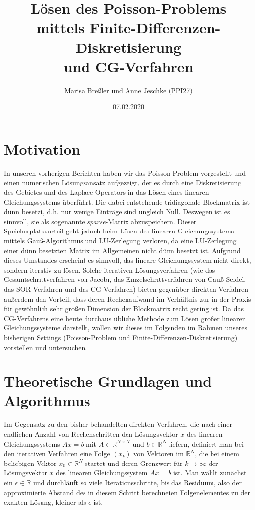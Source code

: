 \documentclass{scrartcl}
\begin{document}
\title{Lösen des Poisson-Problems mittels Finite-Differenzen-Diskretisierung\\
und CG-Verfahren}
\author{Marisa Breßler und Anne Jeschke (PPI27)}
\date{07.02.2020}
\maketitle

\tableofcontents

\pagebreak
\section{Motivation}
In unseren vorherigen Berichten haben wir das Poisson-Problem vorgestellt und einen numerischen Lösungsansatz aufgezeigt, der es durch eine Diskretisierung des Gebietes und des Laplace-Operators in das Lösen eines linearen Gleichungssystems überführt.
Die dabei entstehende tridiagonale Blockmatrix ist dünn besetzt, d.h. nur wenige Einträge sind ungleich Null.
Deswegen ist es sinnvoll, sie als sogenannte \textit{sparse}-Matrix abzuspeichern.
Dieser Speicherplatzvorteil geht jedoch beim Lösen des linearen Gleichungssystems mittels Gauß-Algorithmus und LU-Zerlegung verloren, da eine LU-Zerlegung einer dünn besetzten Matrix im Allgemeinen nicht dünn besetzt ist.
Aufgrund dieses Umstandes erscheint es sinnvoll, das lineare Gleichungssystem nicht direkt, sondern iterativ zu lösen.
Solche iterativen Lösungsverfahren (wie das Gesamtschrittverfahren von Jacobi, das Einzelschrittverfahren von Gauß-Seidel, das SOR-Verfahren und das CG-Verfahren) bieten gegenüber direkten Verfahren außerdem den Vorteil, dass deren Rechenaufwand im Verhältnis zur in der Praxis für gewöhnlich sehr großen Dimension der Blockmatrix recht gering ist.
Da das CG-Verfahrens eine heute durchaus übliche Methode zum Lösen großer linearer Gleichungssysteme darstellt, wollen wir dieses im Folgenden im Rahmen unseres bisherigen Settings (Poisson-Problem und Finite-Differenzen-Diskretisierung) vorstellen und untersuchen.



\pagebreak
\section{Theoretische Grundlagen und Algorithmus}

Im Gegensatz zu den bisher behandelten direkten Verfahren, die nach einer endlichen Anzahl von Rechenschritten den Lösungsvektor $x$ des linearen Gleichungssystems $Ax=b$ mit $A\in\mathbb{R}^{N\times N}$ und $b\in\mathbb{R}^N$ liefern, definiert man bei den iterativen Verfahren eine Folge $(x_k)$ von Vektoren im $\mathbb{R}^N$, die bei einem beliebigen Vektor $x_0\in\mathbb{R}^N$ startet und deren Grenzwert für $k \to \infty$ der Lösungsvektor $x$ des linearen Gleichungssystem $Ax=b$ ist.
Man wählt zunächst ein $\epsilon\in\mathbb{R}$ und durchläuft so viele Iterationsschritte, bis das Residuum, also der approximierte Abstand des in diesem Schritt berechneten Folgenelementes zu der exakten Lösung, kleiner als $\epsilon$ ist.
\end{document}
